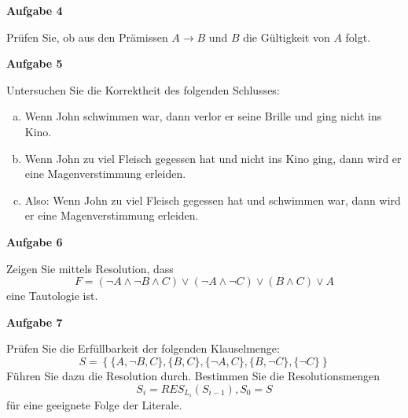 \documentclass[a4paper,12pt]{article}
\newcommand{\Aufgabe}[1]{
	{
		\vspace*{0.5cm}
		\textsf{\textbf{Aufgabe #1}}
		\vspace*{0.2cm}
		
	}
}
\begin{document}
	\Aufgabe{4}
	Prüfen Sie, ob aus den Prämissen $A \rightarrow B$ und $B$ die Gültigkeit von $A$ folgt.
	
	\Aufgabe{5}
	Untersuchen Sie die Korrektheit des folgenden Schlusses:
	\begin{enumerate}[a.]
		\item Wenn John schwimmen war, dann verlor er seine Brille und ging nicht ins Kino.
		\item Wenn John zu viel Fleisch gegessen hat und nicht ins Kino ging, dann wird er eine Magenverstimmung erleiden.
		\item Also: Wenn John zu viel Fleisch gegessen hat und schwimmen war, dann wird er eine Magenverstimmung erleiden.
	\end{enumerate}

	\Aufgabe{6}
	Zeigen Sie mittels Resolution, dass
	$$F=(\neg A \land \neg B \land C) \lor (\neg A \land \neg C) \lor (B \land C) \lor A$$
	eine Tautologie ist.
	
	\Aufgabe{7}
	Prüfen Sie die Erfüllbarkeit der folgenden Klauselmenge:
	$$S = \left\{\{A, \neg B, C\}, \{B, C\}, \{\neg A, C\}, \{B, \neg C\}, \{\neg C\}\right\}$$
	Führen Sie dazu die Resolution durch. Bestimmen Sie die Resolutionsmengen $$S_i=RES_{L_i}(S_{i-1}), S_0=S$$ für eine geeignete Folge der Literale.
\end{document}
